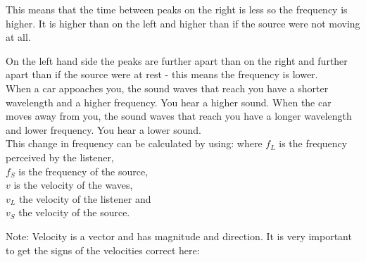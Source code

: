 This means that the time between peaks on the right is less so the
frequency is higher. It is higher than on the left and higher than
if the source were not moving at all.

On the left hand side the peaks are further apart than on the right
and further apart than if the source were at rest - this means the
frequency is lower.\\

When a car appoaches you, the sound waves that reach you have a shorter wavelength and a higher frequency. You hear a higher sound. When the car moves away from you, the sound waves that reach you have a longer wavelength and lower frequency. You hear a lower sound.\\

This change in frequency can be calculated by using:
where $f_L$ is the frequency perceived by the listener, \\
$f_S$ is the frequency of the source, \\
$v$ is the velocity of the waves, \\
$v_L$ the velocity of the listener and \\
$v_S$ the velocity of the source.

Note: Velocity is a vector and has magnitude and direction. It is very important to get the signs of the velocities correct here:

